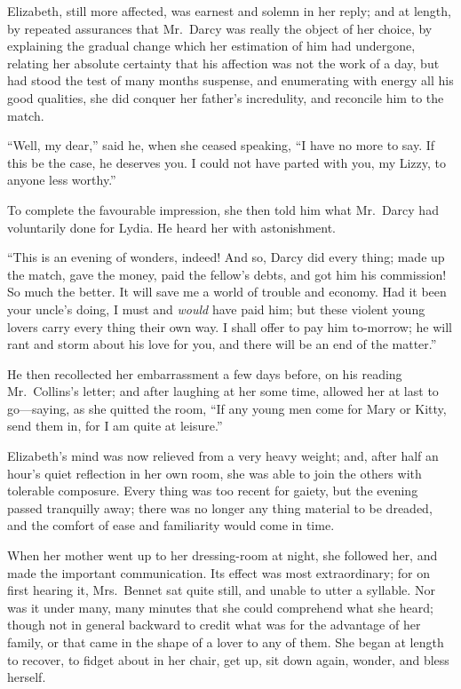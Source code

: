 \documentclass[12pt,english,oneside]{book}
\begin{document}
Elizabeth, still more affected, was earnest and solemn in her reply;
and at length, by repeated assurances that Mr.\ Darcy was really
the object of her choice, by explaining the gradual change which her
estimation of him had undergone, relating her absolute certainty that
his affection was not the work of a day, but had stood the test of
many months suspense, and enumerating with energy all his good qualities,
she did conquer her father's incredulity, and reconcile him to the
match.

{}``Well, my dear,'' said he, when she ceased speaking, {}``I have
no more to say. If this be the case, he deserves you. I could not
have parted with you, my Lizzy, to anyone less worthy.''

To complete the favourable impression, she then told him what Mr.\ Darcy
had voluntarily done for Lydia. He heard her with astonishment.

{}``This is an evening of wonders, indeed! And so, Darcy did every
thing; made up the match, gave the money, paid the fellow's debts,
and got him his commission! So much the better. It will save me a
world of trouble and economy. Had it been your uncle's doing, I must
and \textit{would} have paid him; but these violent young lovers carry
every thing their own way. I shall offer to pay him to-morrow; he
will rant and storm about his love for you, and there will be an end
of the matter.''

He then recollected her embarrassment a few days before, on his reading
Mr.\ Collins's letter; and after laughing at her some time, allowed
her at last to go\mbox{---}saying, as she quitted the room, {}``If
any young men come for Mary or Kitty, send them in, for I am quite
at leisure.''

Elizabeth's mind was now relieved from a very heavy weight; and, after
half an hour's quiet reflection in her own room, she was able to join
the others with tolerable composure. Every thing was too recent for
gaiety, but the evening passed tranquilly away; there was no longer
any thing material to be dreaded, and the comfort of ease and familiarity
would come in time.

When her mother went up to her dressing-room at night, she followed
her, and made the important communication. Its effect was most extraordinary;
for on first hearing it, Mrs.\ Bennet sat quite still, and unable
to utter a syllable. Nor was it under many, many minutes that she
could comprehend what she heard; though not in general backward to
credit what was for the advantage of her family, or that came in the
shape of a lover to any of them. She began at length to recover, to
fidget about in her chair, get up, sit down again, wonder, and bless
herself.
\end{document}
